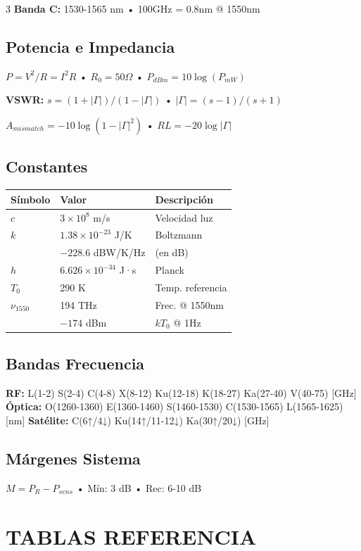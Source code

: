 \documentclass[a4paper,6pt]{extarticle}
\begin{document}
\begin{multicols}{3}
    \textbf{Banda C:} 1530-1565 nm • 100GHz = 0.8nm @ 1550nm

    \subsection*{Potencia e Impedancia}
    $P = V^2/R = I^2 R$ • $R_0 = 50\Omega$ • $P_{dBm} = 10\log(P_{mW})$
    
    \textbf{VSWR:} $s = (1+|\Gamma|)/(1-|\Gamma|)$ • $|\Gamma| = (s-1)/(s+1)$
    
    $A_{mismatch} = -10\log(1-|\Gamma|^2)$ • $RL = -20\log|\Gamma|$

    \subsection*{Constantes}
    \begin{tabular}{|l|l|l|}
    \hline
    \textbf{Símbolo} & \textbf{Valor} & \textbf{Descripción} \\
    \hline
    $c$ & $3\times10^8$ m/s & Velocidad luz \\
    $k$ & $1.38\times10^{-23}$ J/K & Boltzmann \\
    & $-228.6$ dBW/K/Hz & (en dB) \\
    $h$ & $6.626\times10^{-34}$ J·s & Planck \\
    $T_0$ & 290 K & Temp. referencia \\
    $\nu_{1550}$ & 194 THz & Frec. @ 1550nm \\
    & $-174$ dBm & $kT_0$ @ 1Hz \\
    \hline
    \end{tabular}

    \subsection*{Bandas Frecuencia}
    \textbf{RF:} L(1-2) S(2-4) C(4-8) X(8-12) Ku(12-18) K(18-27) Ka(27-40) V(40-75) [GHz]
    \textbf{Óptica:} O(1260-1360) E(1360-1460) S(1460-1530) C(1530-1565) L(1565-1625) [nm]
    \textbf{Satélite:} C(6↑/4↓) Ku(14↑/11-12↓) Ka(30↑/20↓) [GHz]

    \subsection*{Márgenes Sistema}
    $\boxed{M = P_R - P_{sens}}$ • Mín: 3 dB • Rec: 6-10 dB

    \section*{TABLAS REFERENCIA}


\end{multicols}
\end{document}
